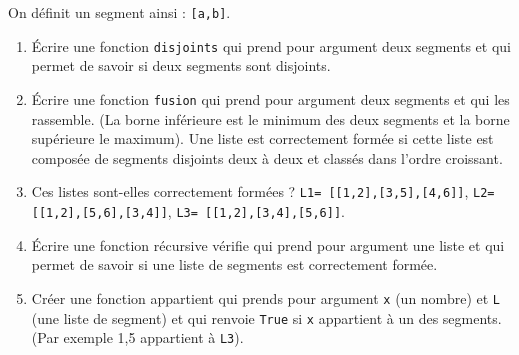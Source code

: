 \documentclass[10pt,fleqn]{article} %
\begin{document}
\begin{multicols}{2}
On définit un segment ainsi : \texttt{[a,b]}.
\begin{enumerate}
\item Écrire une fonction \texttt{disjoints} qui prend pour argument deux segments et qui permet de savoir si deux segments sont disjoints. 
\item Écrire une fonction \texttt{fusion} qui prend pour argument deux segments et qui les rassemble. (La borne inférieure est le minimum des deux segments et la borne supérieure le maximum).
Une liste est correctement formée si cette liste est composée de segments disjoints deux à deux et classés dans l’ordre croissant. 
\item Ces listes sont-elles correctement formées ? 
\texttt{L1= [[1,2],[3,5],[4,6]]}, 
\texttt{L2= [[1,2],[5,6],[3,4]]}, 
\texttt{L3= [[1,2],[3,4],[5,6]]}.
\item Écrire une fonction récursive vérifie qui prend pour argument une liste et qui permet de savoir si une liste de segments est correctement formée. 
\item Créer une fonction appartient qui prends pour argument \texttt{x} (un nombre) et \texttt{L} (une liste de segment) et qui renvoie \texttt{True} si \texttt{x} appartient à un des segments. 
(Par exemple 1,5 appartient à \texttt{L3}).

\end{enumerate}

%
%
%



\end{multicols}
\end{document}
